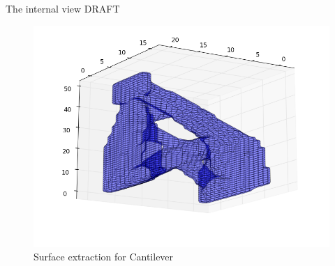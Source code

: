 \begin{frame}{The internal view DRAFT}
\begin{minipage}{0.65\textwidth}
\begin{overlayarea}{\textwidth}{.9\textheight}
\begin{itemize}
\begin{enumerate}
{\begin{itemize}
\begin{figure}[htp]
			\includegraphics[scale=0.15]{Pictures/TopOp/SurfaceExtraction3.png}
			\caption{Surface extraction for Cantilever}
			\label{fig: SurfaceExtraction}
			\end{figure}
		\end{itemize}				
		}
	\end{enumerate}
\end{itemize}
\end{overlayarea}
\end{minipage}
\begin{minipage}{0.3\textwidth}
\begin{overlayarea}{\textwidth}{.9\textheight}
\begin{figure}[htp]
	\centering

\end{figure}
\end{overlayarea}
\end{minipage}
\end{frame}
